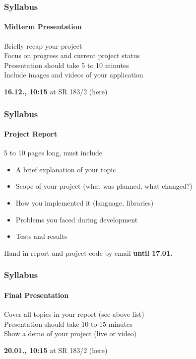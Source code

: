 \documentclass[xetex,professionalfont]{beamer}
\newcommand{\highlight}[1]{\textcolor{tuwcvl_inf_red}{\textbf{#1}}}
\begin{document}

\begin{frame}
\frametitle{Syllabus}
\framesubtitle{Midterm Presentation}

Briefly recap your project\\\medskip
Focus on progress and current project status\\\medskip
Presentation should take 5 to 10 minutes\\\medskip
Include images and videos of your application

\bigskip
\highlight{16.12., 10:15} at SR 183/2 (here)

\end{frame}


\begin{frame}
\frametitle{Syllabus}
\framesubtitle{Project Report}

5 to 10 pages long, must include
\begin{itemize} 
	\item A brief explanation of your topic
	\item Scope of your project (what was planned, what changed?)
	\item How you implemented it (language, libraries)
	\item Problems you faced during development
	\item Tests and results
\end{itemize}

\bigskip
Hand in report and project code by email \highlight{until 17.01.}

\end{frame}


\begin{frame}
\frametitle{Syllabus}
\framesubtitle{Final Presentation}

Cover all topics in your report (see above list)\\\medskip
Presentation should take 10 to 15 minutes\\\medskip
Show a demo of your project (live or video)

\bigskip
\highlight{20.01., 10:15} at SR 183/2 (here)

\end{frame}
\end{document}
